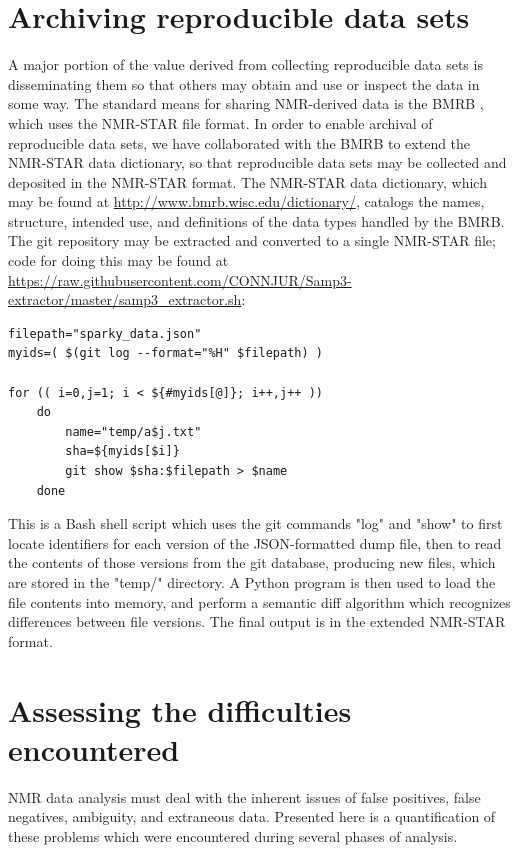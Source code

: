 \section{Archiving reproducible data sets}
A major portion of the value derived from collecting reproducible data sets
is disseminating them so that others may obtain and use or inspect the data
in some way.  The standard means for sharing NMR-derived data is the BMRB
\cite{bmrb}, which uses the NMR-STAR file format.  In order to enable archival
of reproducible data sets, we have collaborated with the BMRB to extend the
NMR-STAR data dictionary, so that reproducible data sets may be collected and
deposited in the NMR-STAR format.
The NMR-STAR data dictionary, which may be found at 
\url{http://www.bmrb.wisc.edu/dictionary/}, catalogs the names, structure,
intended use, and definitions of the data types handled by the BMRB.
The git repository may be extracted and converted to a single NMR-STAR file;
code for doing this may be found at 
\url{https://raw.githubusercontent.com/CONNJUR/Samp3-extractor/master/samp3_extractor.sh}:
\begin{verbatim}
filepath="sparky_data.json"
myids=( $(git log --format="%H" $filepath) )
 
for (( i=0,j=1; i < ${#myids[@]}; i++,j++ )) 
    do
        name="temp/a$j.txt"
        sha=${myids[$i]}
        git show $sha:$filepath > $name
    done
\end{verbatim}
This is a Bash shell script which uses the git commands "log" and "show" to 
first locate identifiers for
each version of the JSON-formatted dump file, then to read the contents of
those versions from the git database, producing new files, which are stored
in the "temp/" directory.  A Python program is then used to load the file
contents into memory, and perform a semantic diff algorithm which recognizes
differences between file versions.  The final output is in the extended
NMR-STAR format.


\section{Assessing the difficulties encountered}
NMR data analysis must deal with the inherent issues of false positives, false 
negatives, ambiguity, and extraneous data.
Presented here is a quantification of these problems which were encountered
during several phases of analysis.

